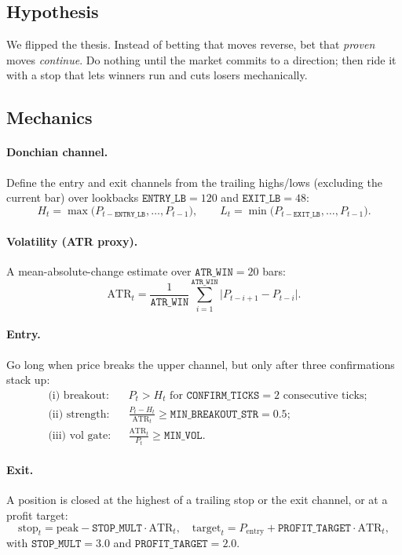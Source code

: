 \documentclass[11pt,a4paper]{article}
\newcommand{\param}[1]{\texttt{#1}}
\begin{document}
\subsection{Hypothesis}
We flipped the thesis. Instead of betting that moves reverse, bet that
\emph{proven} moves \emph{continue}. Do nothing until the market commits to a
direction; then ride it with a stop that lets winners run and cuts losers
mechanically.

\subsection{Mechanics}
\paragraph{Donchian channel.} Define the entry and exit channels from the
trailing highs/lows (excluding the current bar) over lookbacks
$\param{ENTRY\_LB}=120$ and $\param{EXIT\_LB}=48$:
\begin{equation}
  H_t = \max\bigl(P_{t-\param{ENTRY\_LB}}, \dots, P_{t-1}\bigr),\qquad
  L_t = \min\bigl(P_{t-\param{EXIT\_LB}}, \dots, P_{t-1}\bigr).
\end{equation}
\paragraph{Volatility (ATR proxy).} A mean-absolute-change estimate over
$\param{ATR\_WIN}=20$ bars:
\begin{equation}
  \mathrm{ATR}_t = \frac{1}{\param{ATR\_WIN}}\sum_{i=1}^{\param{ATR\_WIN}}\bigl|P_{t-i+1}-P_{t-i}\bigr|.
\end{equation}
\paragraph{Entry.} Go long when price breaks the upper channel, but only after
three confirmations stack up:
\begin{align}
  &\text{(i) breakout:}    && P_t > H_t \text{ for } \param{CONFIRM\_TICKS}=2 \text{ consecutive ticks};\\
  &\text{(ii) strength:}   && \frac{P_t - H_t}{\mathrm{ATR}_t} \ge \param{MIN\_BREAKOUT\_STR}=0.5;\\
  &\text{(iii) vol gate:}  && \frac{\mathrm{ATR}_t}{P_t} \ge \param{MIN\_VOL}.
\end{align}
\paragraph{Exit.} A position is closed at the highest of a trailing stop or the
exit channel, or at a profit target:
\begin{equation}
  \text{stop}_t = \text{peak} - \param{STOP\_MULT}\cdot\mathrm{ATR}_t,\quad
  \text{target}_t = P_{\text{entry}} + \param{PROFIT\_TARGET}\cdot\mathrm{ATR}_t,
\end{equation}
with $\param{STOP\_MULT}=3.0$ and $\param{PROFIT\_TARGET}=2.0$.
\end{document}
